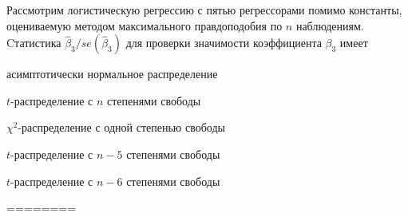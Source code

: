 
\begin{question}
Рассмотрим логистическую регрессию с пятью регрессорами помимо
константы, оцениваемую методом максимального правдоподобия по \(n\)
наблюдениям. Cтатистика \(\hat \beta_3 / se(\hat\beta_3)\) для проверки
значимости коэффициента \(\beta_3\) имеет
\begin{answerlist}
  \item асимптотически нормальное распределение
  \item \(t\)-распределение с \(n\) степенями свободы
  \item \(\chi^2\)-распределение с одной степенью свободы
  \item \(t\)-распределение с \(n-5\) степенями свободы
  \item \(t\)-распределение с \(n-6\) степенями свободы
\end{answerlist}
\end{question}

\begin{solution}
========
\end{solution}

